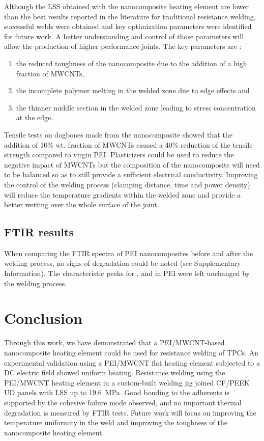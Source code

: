 Although the LSS obtained with the nanocomposite heating element are lower than the best results reported in the literature for traditional resistance welding, successful welds were obtained and key optimization parameters were identified for future work. 
A better understanding and control of those parameters will allow the production of higher performance joints. 
The key parameters are : \begin{enumerate}
	\item the reduced toughness of the nanocomposite due to the addition of a high fraction of MWCNTs,
	\item the incomplete polymer melting in the welded zone due to edge effects and
	\item the thinner middle section in the welded zone leading to stress concentration at the edge. 
\end{enumerate}
Tensile tests on dogbones made from the nanocomposite showed that the addition of 10\% wt. fraction of MWCNTs caused a 40\% reduction of the tensile strength compared to virgin PEI. 
Plasticizers could be used to reduce the negative impact of MWCNTs but the composition of the nanocomposite will need to be balanced so as to still provide a sufficient electrical conductivity. 
Improving the control of the welding process (clamping distance, time and power density) will reduce the temperature gradients within the welded zone and provide a better wetting over the whole surface of the joint. 

\subsection{FTIR results}

When comparing the FTIR spectra of PEI nanocomposites before and after the welding process, no signs of degradation could be noted (see Supplementary Information). 
The characteristic peeks for ,  and  in PEI were left unchanged by the welding process. 

\section{Conclusion}

Through this work, we have demonstrated that a PEI/MWCNT-based nanocomposite heating element could be used for resistance welding of TPCs. 
An experimental validation using a PEI/MWCNT flat heating element subjected to a DC electric field showed uniform heating. 
Resistance welding using the PEI/MWCNT heating element in a custom-built welding jig joined CF/PEEK UD panels with LSS up to \SI{19.6}{\MPa}. 
Good bonding to the adherents is supported by the cohesive failure mode observed, and no important thermal degradation is measured by FTIR tests. 
Future work will focus on improving the temperature uniformity in the weld and improving the toughness of the nanocomposite heating element.

